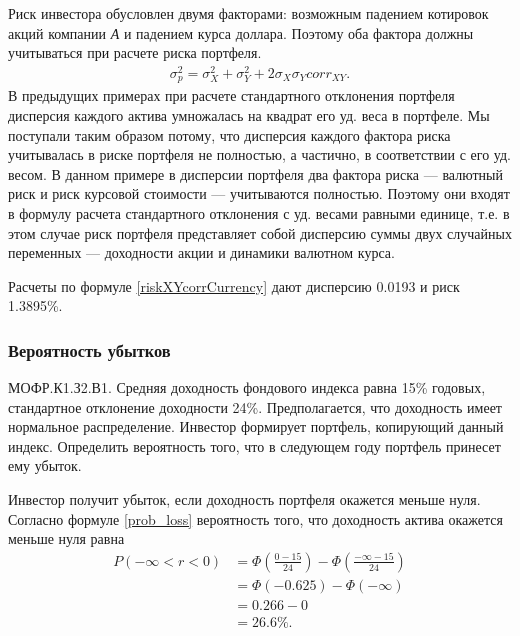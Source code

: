 \documentclass[12pt, table, a4paper,twoside]{exam}
\begin{document}
\begin{questions}
\begin{solution}[6em]

\raggedright
Риск инвестора обусловлен двумя факторами: возможным падением котировок акций компании \textit{А} и падением курса доллара. Поэтому оба фактора должны учитываться при расчете риска портфеля.
\begin{align}
\label{riskXYcorrCurrency}
\sigma_p^2=\sigma_X^2+\sigma_Y^2+2\sigma_X\sigma_Y corr_{XY}.
\end{align}
В предыдущих примерах при расчете стандартного отклонения портфеля дисперсия каждого актива умножалась на квадрат его уд. веса в портфеле. Мы поступали таким образом потому, что дисперсия каждого фактора риска учитывалась в риске портфеля не полностью, а частично, в соответствии с его уд.
весом. В данном примере в дисперсии портфеля два фактора риска — валютный риск и риск курсовой стоимости — учитываются полностью. Поэтому они входят в формулу расчета стандартного отклонения с уд. весами равными единице, т.е. в этом случае риск портфеля представляет собой дисперсию суммы
двух случайных переменных — доходности акции и динамики валютном курса.

Расчеты по формуле \eqref{riskXYcorrCurrency} дают дисперсию 0.0193 и риск 1.3895\%.
\end{solution}

\subsubsection{Вероятность убытков}
\question[10] МОФР.К1.З2.В1. Средняя доходность фондового индекса равна 15\% годовых, стандартное отклонение доходности 24\%. Предполагается, что доходность имеет нормальное распределение. Инвестор формирует портфель, копирующий данный индекс. Определить вероятность того, что в следующем году портфель принесет ему убыток.

\begin{solution}[6em]

\raggedright
Инвестор получит убыток, если доходность портфеля окажется меньше нуля. Согласно формуле \eqref{prob_loss} вероятность того, что доходность актива окажется меньше нуля равна
\begin{align*}
P(-\infty<r<0)&=\Phi\left(\frac{0-15}{24}\right)-\Phi\left(\frac{-\infty-15}{24}\right)\\
&=\Phi(-0.625)-\Phi(-\infty)\\
&=0.266-0\\
&=26.6\%.
\end{align*}
\end{solution}


\end{questions}
\end{document}
